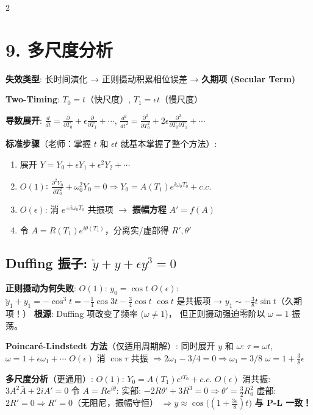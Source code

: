 \documentclass[10pt,a4paper]{article}
\newcommand{\eps}{\epsilon}
\newcommand{\pder}[2]{\frac{\partial #1}{\partial #2}}
\begin{document}
\begin{multicols}{2}
\section{9. 多尺度分析}

\textbf{失效类型}: 长时间演化 → 正则摄动积累相位误差 → \textbf{久期项 (Secular Term)}

\textbf{Two-Timing}: $T_0 = t$（快尺度）, $T_1 = \eps t$（慢尺度）

\textbf{导数展开}:
$\frac{d}{dt} = \pder{}{T_0} + \eps\pder{}{T_1} + \cdots$,
$\frac{d^2}{dt^2} = \pder{^2}{T_0^2} + 2\eps\frac{\partial^2}{\partial T_0\partial T_1} + \cdots$

\textbf{标准步骤}（老师：掌握 $t$ 和 $\eps t$ 就基本掌握了整个方法）:
\begin{enumerate}
\item 展开 $Y = Y_0 + \eps Y_1 + \eps^2 Y_2 + \cdots$
\item $O(1)$: $\pder{^2Y_0}{T_0^2} + \omega_0^2 Y_0 = 0
  \Rightarrow Y_0 = A(T_1)e^{i\omega_0 T_0} + c.c.$
\item $O(\eps)$: 消 $e^{\pm i\omega_0 T_0}$ 共振项
  $\rightarrow$ \textbf{振幅方程} $A' = f(A)$
\item 令 $A = R(T_1)e^{i\theta(T_1)}$，分离实/虚部得 $R', \theta'$
\end{enumerate}

\subsection*{Duffing 振子: $\ddot{y} + y + \eps y^3 = 0$}

\textbf{正则摄动为何失败}:
$O(1)$: $y_0 = \cos t$\;
$O(\eps)$: $\ddot{y}_1 + y_1 = -\cos^3 t = -\frac{1}{4}\cos 3t - \frac{3}{4}\cos t$\;
$\cos t$ 是共振项 → $y_1 \sim -\frac{3}{8}t\sin t$（久期项！）
\textbf{根源}: Duffing 项改变了频率 ($\omega \neq 1$)，
但正则摄动强迫零阶以 $\omega=1$ 振荡。

\textbf{Poincaré-Lindstedt 方法}（仅适用周期解）:
同时展开 $y$ 和 $\omega$: $\tau = \omega t$,
$\omega = 1 + \eps\omega_1 + \cdots$\;
$O(\eps)$ 消 $\cos\tau$ 共振 $\Rightarrow 2\omega_1 - 3/4 = 0 \Rightarrow \omega_1 = 3/8$\;
$\boxed{\omega = 1 + \frac{3}{8}\eps}$

\textbf{多尺度分析}（更通用）:
$O(1)$: $Y_0 = A(T_1)e^{iT_0} + c.c.$\;
$O(\eps)$ 消共振: $3A^2\bar{A} + 2iA' = 0$\;
令 $A = R e^{i\theta}$:
实部: $-2R\theta' + 3R^3 = 0 \Rightarrow \theta' = \frac{3}{2}R_0^2$\;
虚部: $2R' = 0 \Rightarrow R' = 0$（无阻尼，振幅守恒）
$\Rightarrow y \approx \cos\bigl((1 + \frac{3\eps}{8})t\bigr)$ \textbf{与 P-L 一致！}


\end{multicols}
\end{document}
